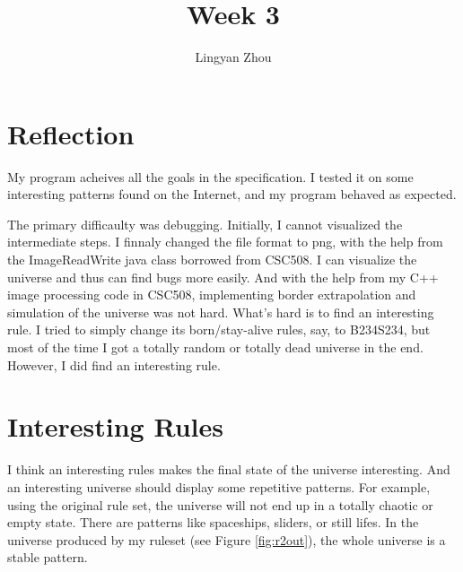 \documentclass[12pt,a4paper]{article}
\author{Lingyan Zhou}
\title{Week 3}
\begin{document}
\maketitle
\tableofcontents
\newpage

\section{Reflection}
My program acheives all the goals in the specification. I tested it on some interesting patterns found on the Internet, 
and my program behaved as expected.

The primary difficaulty was debugging. Initially, I cannot visualized the intermediate steps. I finnaly changed the file format
to png, with the help from the ImageReadWrite java class borrowed from CSC508. I can visualize the universe and thus
can find bugs more easily. And with the help from my C++ image processing code in CSC508, implementing border extrapolation
and simulation of the universe was not hard. What's hard is to find an interesting rule. I tried to simply change its 
born/stay-alive rules, say, to B234S234, but most of the time I got a totally random or totally dead universe in the end. However,
I did find an interesting rule.
\section{Interesting Rules}
I think an interesting rules makes the final state of the universe interesting. And an interesting universe should display some
repetitive patterns. For example, using the original rule set, the universe will not end up in a totally chaotic or empty state.
There are patterns like spaceships, sliders, or still lifes. In the universe produced by my ruleset (see Figure \ref{fig:r2out}), the whole universe is a stable pattern. 
\end{document}
